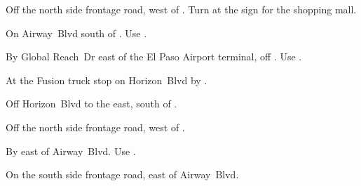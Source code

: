 
\begin{LocationList}

Off the north side  frontage road, west of .
Turn at the sign for the shopping mall.

On Airway~Blvd south of .
Use  .

By Global Reach~Dr east of the El Paso Airport terminal, off .
Use  .

At the Fusion truck stop on  Horizon~Blvd by .

\Location{\GarageHQ \Garage}
Off  Horizon~Blvd to the east, south of .

Off the north side  frontage road, west of .

By  east of Airway~Blvd.
Use  .

On the south side  frontage road, east of Airway~Blvd.

\end{LocationList}
